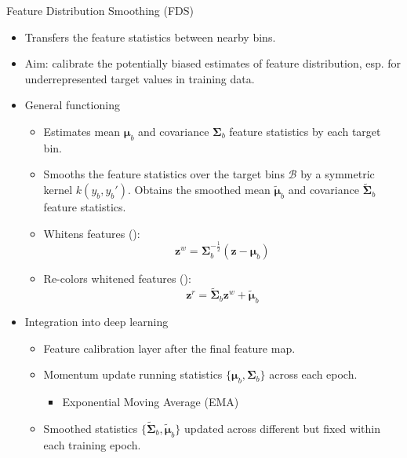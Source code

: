 \begin{frame}[shrink=4]{Feature Distribution Smoothing (FDS)}
	\begin{itemize}
		\item Transfers the feature statistics between nearby bins.
		\item Aim: calibrate the potentially biased estimates of feature distribution, esp. for underrepresented target values in training data.
		\item General functioning
		\begin{itemize}
			\item Estimates mean $\bm{\mu}_b$ and covariance $\bm{\Sigma}_b$ feature statistics by each target bin.
			\item Smooths the feature statistics over the target bins $\mathcal{B}$ by a symmetric kernel $k(y_b,y_b')$. Obtains the smoothed mean $\tilde{\bm{\mu}}_b$ and covariance $\tilde{\bm{\Sigma}}_b$ feature statistics.
			\item Whitens features (\cite{sun2016return}):
			\begin{equation*}
				\bm{z}^w = \bm{\Sigma}_b^{-\frac{1}{2}}(\bm{z} - \bm{\mu}_b)
			\end{equation*}
			\item Re-colors whitened features (\cite{sun2016return}):
			\begin{equation*}
				\bm{z}^r = \tilde{\bm{\Sigma}}_b \bm{z}^w + \tilde{\bm{\mu}}_b
			\end{equation*}
		\end{itemize}
		\item Integration into deep learning
		\begin{itemize}
			\item Feature calibration layer after the final feature map.
			\item Momentum update running statistics $\{\bm{\mu}_b,\bm{\Sigma}_b\}$ across each epoch. 
			\begin{itemize}
				\item Exponential Moving Average (EMA)
			\end{itemize}
			\item Smoothed statistics $\{\tilde{\bm{\Sigma}}_b,\tilde{\bm{\mu}}_b\}$ updated across different but fixed within each training epoch.
		\end{itemize}
	\end{itemize}
\end{frame}
